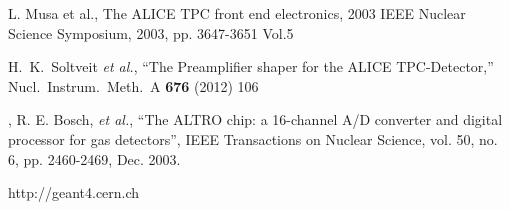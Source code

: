 \documentclass[preprint,5p]{elsarticle}
\begin{document}
\begin{thebibliography}{99}
 L. Musa et al., The ALICE TPC front end electronics, 2003 IEEE Nuclear 
 Science Symposium, 2003, pp. 3647-3651 Vol.5
 
   H.~K.~Soltveit {\it et al.},
   ``The Preamplifier shaper for the ALICE TPC-Detector,''
   Nucl.\ Instrum.\ Meth.\ A {\bf 676} (2012) 106
 
 ,
 R. E. Bosch, {\it et al.}, ``The ALTRO chip: a 16-channel A/D converter and 
 digital processor for gas detectors'', IEEE Transactions on Nuclear Science, 
 vol. 50, no. 6, pp. 2460-2469, Dec. 2003.

http://geant4.cern.ch
 	

\end{thebibliography}
\end{document}
